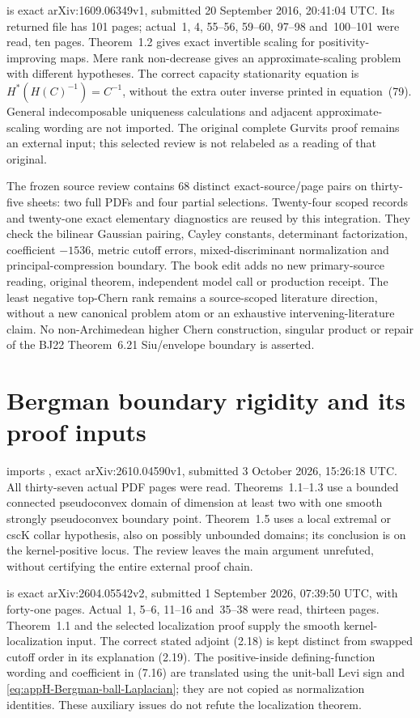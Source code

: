 \cite{Idel16MatrixScalingV1} is exact arXiv:1609.06349v1,
submitted 20 September 2016, 20:41:04 UTC. Its returned file
has 101 pages; actual~1, 4, 55--56, 59--60, 97--98 and~100--101
were read, ten pages. Theorem~1.2 gives exact invertible scaling
for positivity-improving maps. Mere rank non-decrease gives an
approximate-scaling problem with different hypotheses. The correct
capacity stationarity equation is
$H^*(H(C)^{-1})=C^{-1}$, without the extra outer inverse printed
in equation~(79). General indecomposable uniqueness calculations
and adjacent approximate-scaling wording are not imported.
The original complete Gurvits proof remains an external input;
this selected review is not relabeled as a reading of that original.

The frozen source review contains 68 distinct exact-source/page
pairs on thirty-five sheets: two full PDFs and four partial
selections. Twenty-four scoped records and twenty-one exact
elementary diagnostics are reused by this integration. They check
the bilinear Gaussian pairing, Cayley constants, determinant
factorization, coefficient $-1536$, metric cutoff errors,
mixed-discriminant normalization and principal-compression boundary.
The book edit adds no new primary-source reading, original theorem,
independent model call or production receipt. The least negative
top-Chern rank remains a source-scoped literature direction, without
a new canonical problem atom or an exhaustive intervening-literature
claim. No non-Archimedean higher Chern construction, singular
product or repair of the BJ22 Theorem~6.21 Siu/envelope boundary
is asserted.

\section{Bergman boundary rigidity and its proof inputs}
\label{sec:provenance-Bergman-rigidity}

 imports
\cite{EbenfeltGanguly26BergmanV1}, exact arXiv:2610.04590v1,
submitted 3 October 2026, 15:26:18 UTC. All thirty-seven actual
PDF pages were read. Theorems~1.1--1.3 use a bounded connected
pseudoconvex domain of dimension at least two with one smooth
strongly pseudoconvex boundary point. Theorem~1.5 uses a local
extremal or cscK collar hypothesis, also on possibly unbounded
domains; its conclusion is on the kernel-positive locus.
The review leaves the main argument unrefuted, without certifying
the entire external proof chain.

\cite{HsiaoHuangLi26LocalizationV2} is exact arXiv:2604.05542v2,
submitted 1 September 2026, 07:39:50 UTC, with forty-one pages.
Actual~1, 5--6, 11--16 and~35--38 were read, thirteen pages.
Theorem~1.1 and the selected localization proof supply the smooth
kernel-localization input. The correct stated adjoint (2.18) is
kept distinct from swapped cutoff order in its explanation (2.19).
The positive-inside defining-function wording and coefficient
in (7.16) are translated using the unit-ball Levi sign and
\eqref{eq:appH-Bergman-ball-Laplacian}; they are not copied as
normalization identities. These auxiliary issues do not refute
the localization theorem.

